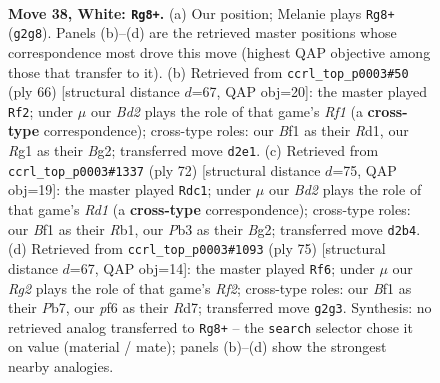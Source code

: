 \documentclass[11pt]{article}
\begin{document}
\begin{figure}[p]\centering
\begin{subfigure}{0.46\textwidth}\centering
\resizebox{\linewidth}{!}{%
\newchessgame
\chessboard[
  setfen={1r2nk2/p1p5/2P2p2/8/3r1P1p/1P6/3B1KRP/5BR1 w - - 0 38},
  showmover=false,
  pgfstyle=straightmove, color=movearrow, markmove={g2-g8}
]}
\caption{}
\end{subfigure}\hfill
\begin{subfigure}{0.46\textwidth}\centering
\resizebox{\linewidth}{!}{%
\newchessgame
\chessboard[
  setfen={5k2/p1p4r/2n5/8/Prb1PPP1/7P/6B1/3R1RK1 w - - 0 34},
  showmover=false,
  pgfstyle=straightmove, color=movearrow, markmove={f1-f2}
]}
\caption{}
\end{subfigure}
\\[4pt]
\begin{subfigure}{0.46\textwidth}\centering
\resizebox{\linewidth}{!}{%
\newchessgame
\chessboard[
  setfen={8/1p2kp2/1p5p/2n1P1p1/b3P1P1/2r4P/6B1/1R1R2K1 w - - 0 37},
  showmover=false,
  pgfstyle=straightmove, color=movearrow, markmove={d1-c1}
]}
\caption{}
\end{subfigure}\hfill
\begin{subfigure}{0.46\textwidth}\centering
\resizebox{\linewidth}{!}{%
\newchessgame
\chessboard[
  setfen={8/1p1r1rk1/p2bR3/3p3p/P2P1p1P/1R6/1P1B1P2/5K2 b - - 3 38},
  showmover=false,
  pgfstyle=straightmove, color=movearrow, markmove={f7-f6}
]}
\caption{}
\end{subfigure}
\caption{\textbf{Move 38, White: \texttt{Rg8+}.} (a) Our position; Melanie plays \texttt{Rg8+} (\texttt{g2g8}). Panels (b)--(d) are the retrieved master positions whose correspondence most drove this move (highest QAP objective among those that transfer to it). (b) Retrieved from \texttt{ccrl\_top\_p0003\#50} (ply 66) [structural distance $d$=67, QAP obj=20]: the master played \texttt{Rf2}; under $\mu$ our \emph{Bd2} plays the role of that game's \emph{Rf1} (a \textbf{cross-type} correspondence); cross-type roles: our \emph{B}f1 as their \emph{R}d1, our \emph{R}g1 as their \emph{B}g2; transferred move \texttt{d2e1}. (c) Retrieved from \texttt{ccrl\_top\_p0003\#1337} (ply 72) [structural distance $d$=75, QAP obj=19]: the master played \texttt{Rdc1}; under $\mu$ our \emph{Bd2} plays the role of that game's \emph{Rd1} (a \textbf{cross-type} correspondence); cross-type roles: our \emph{B}f1 as their \emph{R}b1, our \emph{P}b3 as their \emph{B}g2; transferred move \texttt{d2b4}. (d) Retrieved from \texttt{ccrl\_top\_p0003\#1093} (ply 75) [structural distance $d$=67, QAP obj=14]: the master played \texttt{Rf6}; under $\mu$ our \emph{Rg2} plays the role of that game's \emph{Rf2}; cross-type roles: our \emph{B}f1 as their \emph{P}b7, our \emph{p}f6 as their \emph{R}d7; transferred move \texttt{g2g3}. Synthesis: no retrieved analog transferred to \texttt{Rg8+} -- the \texttt{search} selector chose it on value (material / mate); panels (b)--(d) show the strongest nearby analogies.}
\label{fig:thought-m74}
\end{figure}
\end{document}
